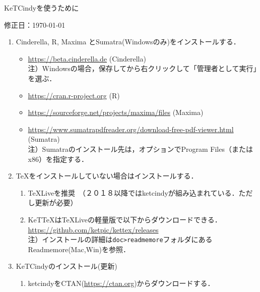 \documentclass{ujarticle}
\begin{document}
\begin{center}
KeTCindyを使うために
\end{center}

\vspace{-5mm}

\hfill 修正日：\today

\begin{enumerate}[\bf\large 1.]
\item Cinderella, R, Maxima とSumatra(Windowsのみ)をインストールする．\vspace{-2mm}

 \begin{itemize}
 \item \url{https://beta.cinderella.de}  (Cinderella)\\
\hspace*{6mm}注）Windowsの場合，保存してから右クリックして「管理者として実行」を選ぶ．
 \item \url{https://cran.r-project.org}   (R)
 \item \url{https://sourceforge.net/projects/maxima/files}  (Maxima)
 \item \url{https://www.sumatrapdfreader.org/download-free-pdf-viewer.html} (Sumatra)\\
\hspace*{6mm}注）Sumatraのインストール先は，オプションでProgram Files（またはx86）を指定する．

 \end{itemize}
\item TeXをインストールしていない場合はインストールする．\vspace{-2mm}
 \begin{enumerate}[(1)]
 \item TeXLiveを推奨　（２０１８以降ではketcindyが組み込まれている．ただし更新が必要）
 \item KeTTeXはTeXLiveの軽量版で以下からダウンロードできる．\\
\hspace*{3mm}\url{https://github.com/ketpic/kettex/releases}\\
    \hspace*{6mm}注）インストールの詳細は\verb|doc>readmemore|フォルダにあるReadmemore(Mac,Win)を参照．
\end{enumerate}
 
\item KeTCindyのインストール(更新)\vspace{-2mm}
  \begin{enumerate}[(1)]
  \item ketcindyをCTAN(\url{https://ctan.org})からダウンロードする．
    \begin{itemize}


\end{itemize}
\end{enumerate}
\end{enumerate}
\end{document}
